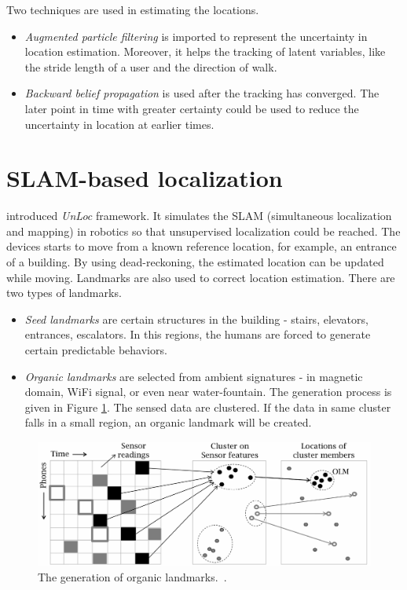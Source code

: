 \documentclass[letterpaper]{article}
\begin{document}
Two techniques are used in estimating the locations.
\begin{itemize}
\item \emph{Augmented particle filtering} is imported to represent the uncertainty in location estimation.
Moreover, it helps the tracking of latent variables, like the stride length of a user and the direction of walk.
\item \emph{Backward belief propagation} is used after the tracking has converged.
The later point in time with greater certainty could be used to reduce the uncertainty in location at earlier times.
\end{itemize}


\section{SLAM-based localization}

\cite{Wang:2012:NNW:2307636.2307655} introduced \emph{UnLoc} framework.
It simulates the SLAM (simultaneous localization and mapping) in robotics so that unsupervised localization could be reached.
The devices starts to move from a known reference location, for example, an entrance of a building.
By using dead-reckoning, the estimated location can be updated while moving.
Landmarks are also used to correct location estimation.
There are two types of landmarks.
\begin{itemize}
	\item \emph{Seed landmarks} are certain structures in the building - stairs, elevators, entrances, escalators.
	In this regions, the humans are forced to generate certain predictable behaviors.
	\item \emph{Organic landmarks} are selected from ambient signatures - in magnetic domain, WiFi signal, or even near water-fountain.
	The generation process is given in Figure \ref{fig:olm}.
	The sensed data are clustered.
	If the data in same cluster falls in a small region, an organic landmark will be created.
\end{itemize}
\begin{figure}
	\centering
	\includegraphics[width=0.9\linewidth]{fig/OLM.png}
	\caption{The generation of organic landmarks.~\cite{Wang:2012:NNW:2307636.2307655}.}
	\label{fig:olm}
\end{figure}
\end{document}
